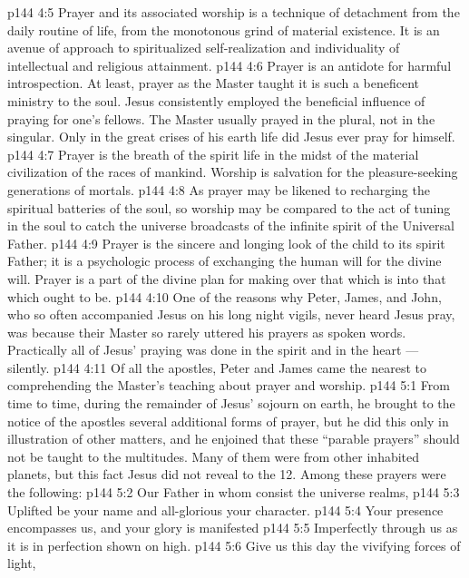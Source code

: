 \vs p144 4:5 Prayer and its associated worship is a technique of detachment from the daily routine of life, from the monotonous grind of material existence. It is an avenue of approach to spiritualized self\hyp{}realization and individuality of intellectual and religious attainment.
\vs p144 4:6 Prayer is an antidote for harmful introspection. At least, prayer as the Master taught it is such a beneficent ministry to the soul. Jesus consistently employed the beneficial influence of praying for one’s fellows. The Master usually prayed in the plural, not in the singular. Only in the great crises of his earth life did Jesus ever pray for himself.
\vs p144 4:7 Prayer is the breath of the spirit life in the midst of the material civilization of the races of mankind. Worship is salvation for the pleasure\hyp{}seeking generations of mortals.
\vs p144 4:8 As prayer may be likened to recharging the spiritual batteries of the soul, so worship may be compared to the act of tuning in the soul to catch the universe broadcasts of the infinite spirit of the Universal Father.
\vs p144 4:9 Prayer is the sincere and longing look of the child to its spirit Father; it is a psychologic process of exchanging the human will for the divine will. Prayer is a part of the divine plan for making over that which is into that which ought to be.
\vs p144 4:10 \pc One of the reasons why Peter, James, and John, who so often accompanied Jesus on his long night vigils, never heard Jesus pray, was because their Master so rarely uttered his prayers as spoken words. Practically all of Jesus’ praying was done in the spirit and in the heart --- silently.
\vs p144 4:11 Of all the apostles, Peter and James came the nearest to comprehending the Master’s teaching about prayer and worship.
\vs p144 5:1 From time to time, during the remainder of Jesus’ sojourn on earth, he brought to the notice of the apostles several additional forms of prayer, but he did this only in illustration of other matters, and he enjoined that these “parable prayers” should not be taught to the multitudes. Many of them were from other inhabited planets, but this fact Jesus did not reveal to the 12. Among these prayers were the following:
\vsetoff
\vs p144 5:2 Our Father in whom consist the universe realms,
\vs p144 5:3 \hsetoff Uplifted be your name and all\hyp{}glorious your character.
\vs p144 5:4 Your presence encompasses us, and your glory is manifested
\vs p144 5:5 \hsetoff Imperfectly through us as it is in perfection shown on high.
\vs p144 5:6 Give us this day the vivifying forces of light,
